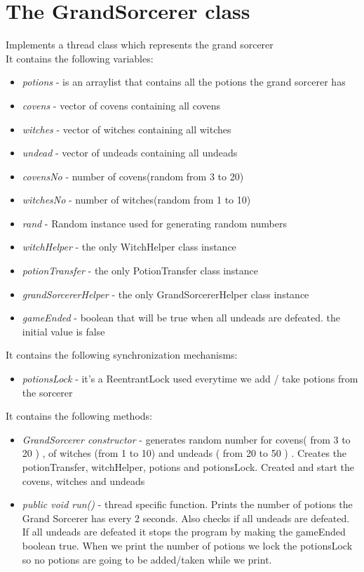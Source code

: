 \documentclass[14pt]{article}
\begin{document}
\section*{The GrandSorcerer class}
\vspace{5 mm}
Implements a thread class which represents the grand sorcerer\\
It contains the following variables:\\ 
\begin{itemize}
            \item \textit{potions} - is an arraylist that contains all the potions the grand sorcerer has
            \item \textit{covens} - vector of covens containing all covens
            \item \textit{witches} - vector of witches containing all witches
            \item \textit{undead} - vector of undeads containing all undeads
            \item \textit{covensNo} - number of covens(random from 3 to 20)
            \item \textit{witchesNo} - number of witches(random from 1 to 10)
            \item \textit{rand} - Random instance used for generating random numbers
            \item \textit{witchHelper} - the only WitchHelper class instance
            \item \textit{potionTransfer} - the only PotionTransfer class instance
            \item \textit{grandSorcererHelper} - the only GrandSorcererHelper class instance
            \item \textit{gameEnded} - boolean that will be true when all undeads are defeated. the initial value is false
\end{itemize}
It contains the following synchronization mechanisms:\\
\begin{itemize}
            \item \textit{potionsLock} - it's a ReentrantLock used everytime we add / take potions from the sorcerer
\end{itemize}
It contains the following methods:\\
\begin{itemize}
            \item \textit{GrandSorcerer constructor} - generates random number for covens( from 3 to 20 ) , of witches (from 1 to 10) and undeads ( from 20 to 50 ) . Creates the potionTransfer, witchHelper, potions and potionsLock. Created and start the covens, witches and undeads
            \item \textit{public void run()} - thread specific function. Prints the number of potions the Grand Sorcerer has every 2 seconds. Also checks if all undeads are defeated. If all undeads are defeated it stops the program by making the gameEnded boolean true. When we print the number of potions we lock the potionsLock so no potions are going to be added/taken while we print.
\end{itemize}
\end{document}
